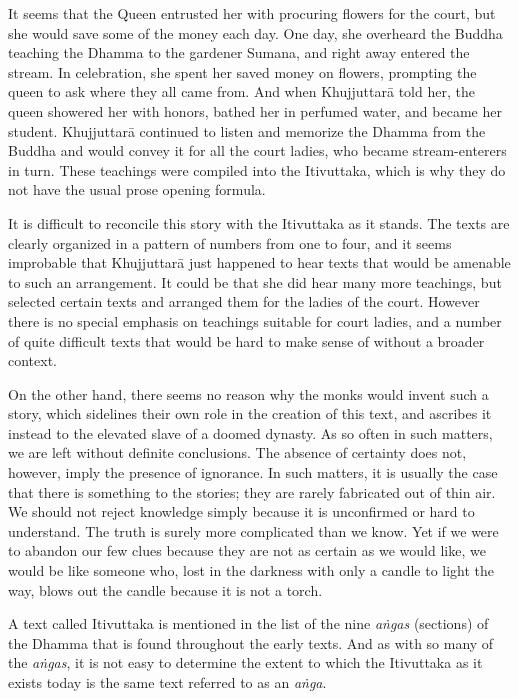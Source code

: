 \documentclass[12pt,openany]{book}%
\begin{document}
It seems that the Queen entrusted her with procuring flowers for the court, but she would save some of the money each day. One day, she overheard the Buddha teaching the Dhamma to the gardener Sumana, and right away entered the stream. In celebration, she spent her saved money on flowers, prompting the queen to ask where they all came from. And when \textsanskrit{Khujjuttarā} told her, the queen showered her with honors, bathed her in perfumed water, and became her student. \textsanskrit{Khujjuttarā} continued to listen and memorize the Dhamma from the Buddha and would convey it for all the court ladies, who became stream-enterers in turn. These teachings were compiled into the Itivuttaka, which is why they do not have the usual prose opening formula.

It is difficult to reconcile this story with the Itivuttaka as it stands. The texts are clearly organized in a pattern of numbers from one to four, and it seems improbable that \textsanskrit{Khujjuttarā} just happened to hear texts that would be amenable to such an arrangement. It could be that she did hear many more teachings, but selected certain texts and arranged them for the ladies of the court. However there is no special emphasis on teachings suitable for court ladies, and a number of quite difficult texts that would be hard to make sense of without a broader context.

On the other hand, there seems no reason why the monks would invent such a story, which sidelines their own role in the creation of this text, and ascribes it instead to the elevated slave of a doomed dynasty. As so often in such matters, we are left without definite conclusions. The absence of certainty does not, however, imply the presence of ignorance. In such matters, it is usually the case that there is something to the stories; they are rarely fabricated out of thin air. We should not reject knowledge simply because it is unconfirmed or hard to understand. The truth is surely more complicated than we know. Yet if we were to abandon our few clues because they are not as certain as we would like, we would be like someone who, lost in the darkness with only a candle to light the way, blows out the candle because it is not a torch.

A text called Itivuttaka is mentioned in the list of the nine \emph{\textsanskrit{aṅgas}} (sections) of the Dhamma that is found throughout the early texts. And as with so many of the \emph{\textsanskrit{aṅgas}}, it is not easy to determine the extent to which the Itivuttaka as it exists today is the same text referred to as an \emph{\textsanskrit{aṅga}}.
\end{document}
